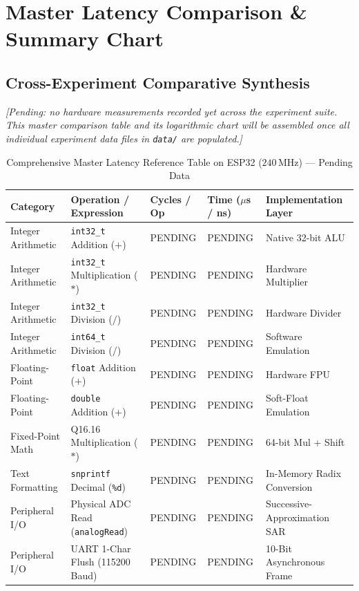 \section{Master Latency Comparison \& Summary Chart}

\subsection{Cross-Experiment Comparative Synthesis}
\textit{[Pending: no hardware measurements recorded yet across the experiment suite. This master comparison table and its logarithmic chart will be assembled once all individual experiment data files in \texttt{data/} are populated.]}

\begin{table}[htbp]
\centering
\caption{Comprehensive Master Latency Reference Table on ESP32 ($240\,\text{MHz}$) --- Pending Data}
\label{tab:master_comparison}
\small
\begin{tabularx}{\textwidth}{l l X X X}
\toprule
\textbf{Category} & \textbf{Operation / Expression} & \textbf{Cycles / Op} & \textbf{Time ($\mu$s / ns)} & \textbf{Implementation Layer} \\
\midrule
Integer Arithmetic & \texttt{int32\_t} Addition ($+$) & PENDING & PENDING & Native 32-bit ALU \\
Integer Arithmetic & \texttt{int32\_t} Multiplication ($*$) & PENDING & PENDING & Hardware Multiplier \\
Integer Arithmetic & \texttt{int32\_t} Division ($/$) & PENDING & PENDING & Hardware Divider \\
Integer Arithmetic & \texttt{int64\_t} Division ($/$) & PENDING & PENDING & Software Emulation \\
Floating-Point & \texttt{float} Addition ($+$) & PENDING & PENDING & Hardware FPU \\
Floating-Point & \texttt{double} Addition ($+$) & PENDING & PENDING & Soft-Float Emulation \\
Fixed-Point Math & Q16.16 Multiplication ($*$) & PENDING & PENDING & 64-bit Mul + Shift \\
Text Formatting & \texttt{snprintf} Decimal (\texttt{\%d}) & PENDING & PENDING & In-Memory Radix Conversion \\
Peripheral I/O & Physical ADC Read (\texttt{analogRead}) & PENDING & PENDING & Successive-Approximation SAR \\
Peripheral I/O & UART 1-Char Flush (115200 Baud) & PENDING & PENDING & 10-Bit Asynchronous Frame \\
\bottomrule
\end{tabularx}
\end{table}

